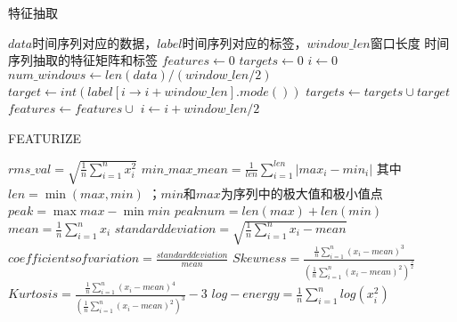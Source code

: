 \documentclass[11pt]{ctexart}
\begin{document}
    \begin{algorithm}
        \caption{特征抽取}
        \begin{algorithmic}[1] %
            \Require $data$时间序列对应的数据，$label$时间序列对应的标签，$window\_len$窗口长度
            \Ensure 时间序列抽取的特征矩阵和标签
                \State $features \gets 0$
                \State $targets \gets 0$
                \State $i \gets 0$
                \State $num\_windows \gets len(data)/(window\_len/2)$
                     \State $target  \gets int(label[i\to i+window\_len].mode())$
                     \State $targets \gets targets\cup target$
                     	\State $features \gets features \cup $ 
                     \EndFor
                     \State $i \gets i+window\_len/2$
                \EndFor
                \State {}
            \EndFunction    
        \end{algorithmic}
    \end{algorithm}
    
        \begin{algorithm}
    	\caption{FEATURIZE}
	\begin{algorithmic}[1] %
	   \State $rms\_val = \sqrt{\frac{1}{n}\sum_{i=1}^{n}x_i^2}$
	   \State $min\_max\_mean = \frac{1}{len}\sum_{i=1}^{len}|max_i-min_i|$ 其中 $len=\min{(max , min)}$ ；$min$和$max$为序列中的极大值和极小值点
	   \State $peak = \max max - \min min$
	   \State $peaknum = len(max)+len(min)$
	   \State $mean = \frac{1}{n}\sum_{i=1}^{n}x_i$
	   \State $standard deviation = \sqrt{\frac{1}{n}\sum_{i=1}^{n}x_i-mean}$
	   \State $coefficients of variation = \frac{standard deviation}{mean}$
	   \State $Skewness = \frac{\frac{1}{n}\sum_{i=1}^{n}(x_i-mean)^3}{(\frac{1}{n}\sum_{i=1}^{n}(x_i-mean)^2)^{\frac{3}{2}}}$
	   \State $Kurtosis = \frac{\frac{1}{n}\sum_{i=1}^{n}(x_i-mean)^4}{(\frac{1}{n}\sum_{i=1}^{n}(x_i-mean)^2)^{3}}-3$
	   \State $log-energy = \frac{1}{n}\sum_{i=1}^{n}log(x_i^2) $
	\end{algorithmic}
    \end{algorithm}
    
\end{document}
